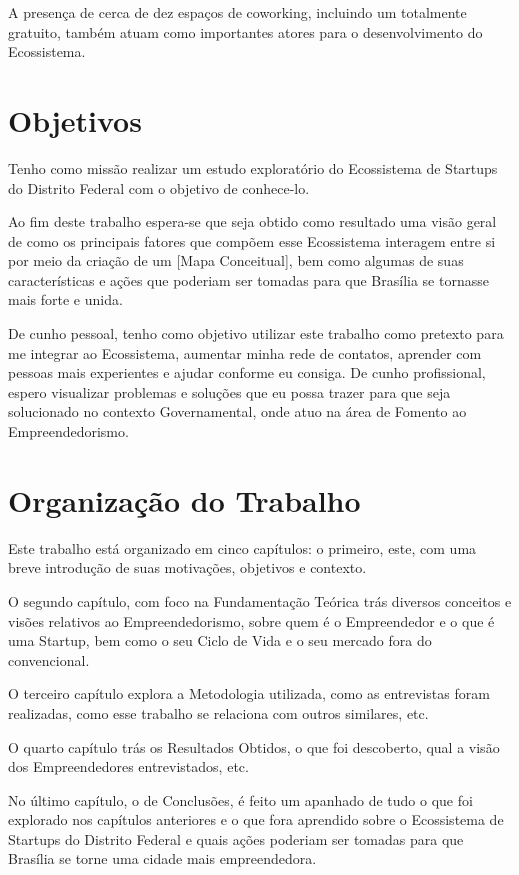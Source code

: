 A presença de cerca de dez espaços de coworking, incluindo um totalmente gratuito, também atuam como importantes atores para o desenvolvimento do Ecossistema.

\section{Objetivos}
\label{section:objetivos}

Tenho como missão realizar um estudo exploratório do Ecossistema de Startups do Distrito Federal com o objetivo de conhece-lo. 

Ao fim deste trabalho espera-se que seja obtido como resultado uma visão geral de como os principais fatores que compõem esse Ecossistema interagem entre si por meio da criação de um [Mapa Conceitual], bem como algumas de suas características e ações que poderiam ser tomadas para que Brasília se tornasse mais forte e unida.

De cunho pessoal, tenho como objetivo utilizar este trabalho como pretexto para me integrar ao Ecossistema, aumentar minha rede de contatos, aprender com pessoas mais experientes e ajudar conforme eu consiga. De cunho profissional, espero visualizar problemas e soluções que eu possa trazer para que seja solucionado no contexto Governamental, onde atuo na área de Fomento ao Empreendedorismo.

\section{Organização do Trabalho}
\label{section:organizacao_do_trabalho}

Este trabalho está organizado em cinco capítulos: o primeiro, este, com uma breve introdução de suas motivações, objetivos e contexto. 

O segundo capítulo, com foco na Fundamentação Teórica trás diversos conceitos e visões relativos ao Empreendedorismo, sobre quem é o Empreendedor e o que é uma Startup, bem como o seu Ciclo de Vida e o seu mercado fora do convencional. 

O terceiro capítulo explora a Metodologia utilizada, como as entrevistas foram realizadas, como esse trabalho se relaciona com outros similares, etc. 

O quarto capítulo trás os Resultados Obtidos, o que foi descoberto, qual a visão dos Empreendedores entrevistados, etc.

No último capítulo, o de Conclusões, é feito um apanhado de tudo o que foi explorado nos capítulos anteriores e o que fora aprendido sobre o Ecossistema de Startups do Distrito Federal e quais ações poderiam ser tomadas para que Brasília se torne uma cidade mais empreendedora.